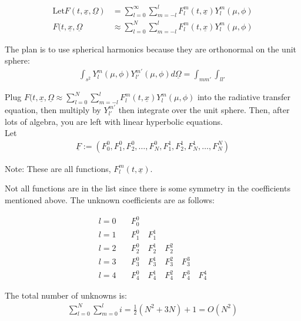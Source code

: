 \documentclass[12pt]{article}
\newcommand{\bunderline}[1]{\underline{#1}}
\renewcommand{\vec}[1]{{\bunderline{#1}}}
\begin{document}
\begin{align*}
\text{Let} F(t, \vec{x}, \vec{\Omega}) &= \sum^{\infty}_{l=0} \sum^{l}_{m=-l}  F^m _l (t, \vec{x}) Y^m _l (\mu, \phi) \\
F(t, \vec{x}, \vec{\Omega} &\approx \sum^{N}_{l=0} \sum^{l}_{m=-l} F^m _l (t, \vec{x}) Y^m _l (\mu, \phi)
\end {align*}

The plan is to use spherical harmonics because they are orthonormal on the unit sphere:
\begin{align*}
\int_{s^2} Y^m _l (\mu, \phi) Y^{m'} _{l'} (\mu, \phi) d\vec{\Omega} = \int_{m m'} \int_{l l'}
\end{align*}

Plug $F(t, \vec{x}, \vec{\Omega} \approx \sum^{N}_{l=0} \sum^{l}_{m=-l} F^m _l (t, \vec{x}) Y^m _l (\mu, \phi)$ into the radiative transfer equation, then multiply by $Y^{m'} _{l'}$ then integrate over the unit sphere. Then, after lots of algebra, you are left with linear hyperbolic equations. \\

Let 
\begin{align*}
\vec{F} := (F^0 _0, F^0 _1, F^0 _2, \dots , F^0 _N, F^1 _1, F^1 _2, F^1 _N, \dots , F^N _N)
\end{align*}

Note: These are all functions, $F^m _l (t, \vec{x})$.

Not all functions are in the list since there is some symmetry in the coefficients mentioned above. The unknown coefficients are as follows:

\begin{align*}
l = 0 \quad & F^0 _0 \\
l = 1 \quad & F^0 _1 \quad F^1 _1 \\
l = 2 \quad & F^0 _2 \quad F^1 _2 \quad F^2 _2 \\
l = 3 \quad & F^0 _3 \quad F^1 _3 \quad F^2 _3 \quad F^3 _3 \\
l = 4 \quad & F^0 _4 \quad F^1 _4 \quad F^2 _4 \quad F^3 _4 \quad F^4 _4
\end{align*}

The total number of unknowns is:
\begin{align*}
\sum^N _{l=0} \sum^l _{m=0} i = \frac{1}{2} (N^2 + 3N) + 1 = O(N^2)
\end{align*}
\end{document}
